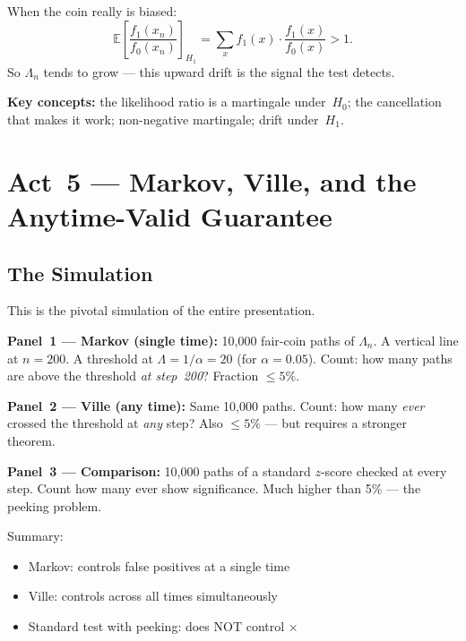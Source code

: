\documentclass[12pt, a4paper]{article}
\newcommand{\E}{\mathbb{E}}            %
\newcommand{\LR}{\Lambda}              %
\begin{document}
When the coin really is biased:
\[
  \E\!\left[\frac{f_1(x_n)}{f_0(x_n)}\right]_{\!H_1}
  = \sum_x f_1(x) \cdot \frac{f_1(x)}{f_0(x)}
  > 1.
\]
So $\LR_n$ tends to grow --- this upward drift is the signal the test detects.

\begin{keytakeaway}
\textbf{Key concepts:} the likelihood ratio is a martingale under~$H_0$;
the cancellation that makes it work; non-negative martingale; drift under~$H_1$.
\end{keytakeaway}


\newpage
\section{Act~5 --- Markov, Ville, and the Anytime-Valid Guarantee}

\subsection{The Simulation}

\begin{simulation}
This is the pivotal simulation of the entire presentation.

\textbf{Panel~1 --- Markov (single time):}
10,000 fair-coin paths of $\LR_n$.  A vertical line at $n=200$.
A threshold at $\LR = 1/\alpha = 20$ (for $\alpha = 0.05$).
Count: how many paths are above the threshold \emph{at step~200}?
Fraction $\leq 5\%$.

\textbf{Panel~2 --- Ville (any time):}
Same 10,000 paths.  Count: how many \emph{ever} crossed the threshold at
\emph{any} step?  Also $\leq 5\%$ --- but requires a stronger theorem.

\textbf{Panel~3 --- Comparison:}
10,000 paths of a standard $z$-score checked at every step.  Count how many
ever show significance.  Much higher than 5\% --- the peeking problem.

Summary:
\begin{itemize}[nosep]
  \item Markov: controls false positives at a single time \checkmark
  \item Ville: controls across all times simultaneously \checkmark
  \item Standard test with peeking: does NOT control $\times$
\end{itemize}
\end{simulation}
\end{document}
